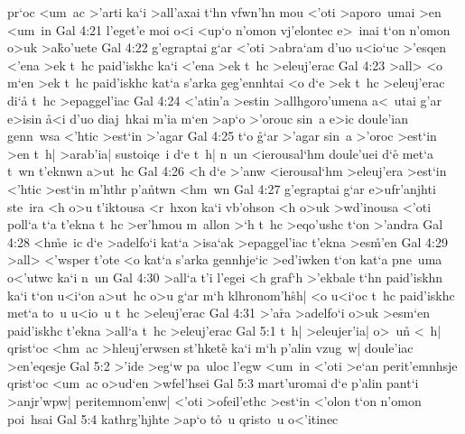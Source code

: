 pr`oc
<um~ac
>'arti
ka`i
>all'axai
t`hn
vfwn'hn
mou
<'oti
>aporo~umai
>en
<um~in\bibvsend
\vs Gal 4:21
l'eget'e
moi
o<i
<up`o
n'omon
vj'elontec
e>~inai
t`on
n'omon
o>uk
>a\r{k}o'uete\bibvsend
{}
\vs Gal 4:22
g'egraptai
g`ar
<'oti
>abra`am
d'uo
u<io`uc
>'esqen
<'ena
>ek
t~hc
paid'iskhc
ka`i
<'ena
>ek
t~hc
>eleuj'erac\bibvsend
\vs Gal 4:23
>all>
<o
m`en
>ek
t~hc
paid'iskhc
kat`a
s'arka
geg'ennhtai
<o
d`e
>ek
t~hc
>eleuj'erac
di`a\r{}
t~hc
>epaggel'iac\bibvsend
\vs Gal 4:24
<'atin'a
>estin
>allhgoro'umena
a<~utai
g'ar
e>isin
\r{a}<i
d'uo
diaj~hkai
m'ia
m`en
>ap`o
>'orouc
sin~a
e>ic
doule'ian
genn~wsa
<'htic
>est`in
>'agar\bibvsend
\vs Gal 4:25
t`o
\r{g}`ar
>'agar
sin~a
>'oroc
>est`in
>en
t~h|
>arab'ia|
sustoiqe~i
d`e
t~h|
n~un
<ierousal`hm
doule'uei
d`e\r{}
met`a
t~wn
t'eknwn
a>ut~hc\bibvsend
\vs Gal 4:26
<h
d`e
>'anw
<ierousal`hm
>eleuj'era
>est`in
<'htic
>est`in
m'hthr
p'a\r{n}twn
<hm~wn\bibvsend
\vs Gal 4:27
g'egraptai
g`ar
e>ufr'anjhti
ste~ira
<h
o>u
t'iktousa
<r~hxon
ka`i
vb'ohson
<h
o>uk
>wd'inousa
<'oti
poll`a
t`a
t'ekna
t~hc
>er'hmou
m~allon
>`h
t~hc
>eqo'ushc
t`on
>'andra\bibvsend
\vs Gal 4:28
<h\r{m}e~ic
d`e
>adelfo`i
kat`a
>isa`ak
>epaggel'iac
t'ekna
>es\r{m}'en\bibvsend
{}
\vs Gal 4:29
>all>
<'wsper
t'ote
<o
kat`a
s'arka
gennhje`ic
>ed'iwken
t`on
kat`a
pne~uma
o<'utwc
ka`i
n~un\bibvsend
\vs Gal 4:30
>all`a
t'i
l'egei
<h
graf`h
>'ekbale
t`hn
paid'iskhn
ka`i
t`on
u<i`on
a>ut~hc
o>u
g`ar
m`h
klhronom'h\r{s}h|
<o
u<i`oc
t~hc
paid'iskhc
met`a
to~u
u<io~u
t~hc
>eleuj'erac\bibvsend
\vs Gal 4:31
>'a\r{r}a
>adelfo`i
o>uk
>esm`en
paid'iskhc
t'ekna
>all`a
t~hc
>eleuj'erac\bibvsend
\vs Gal 5:1
t~h|
>eleujer'ia|
o>~un\r{}
<~h|
qrist`oc
<hm~ac
>hleuj'erwsen
st'hket\r{e}
ka`i
m`h
p'alin
vzug~w|
doule'iac
>en'eqesje\bibvsend
\vs Gal 5:2
>'ide
>eg`w
pa~uloc
l'egw
<um~in
<'oti
>e`an
perit'emnhsje
qrist`oc
<um~ac
o>ud`en
>wfel'hsei\bibvsend
\vs Gal 5:3
mart'uromai
d`e
p'alin
pant`i
>anjr'wpw|
peritemnom'enw|
<'oti
>ofeil'ethc
>est`in
<'olon
t`on
n'omon
poi~hsai\bibvsend
\vs Gal 5:4
kathrg'hjhte
>ap`o
t\r{o}~u
qristo~u
o<'itinec
